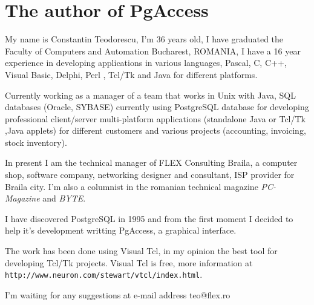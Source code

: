 \section{The author of PgAccess}
My name is Constantin Teodorescu, I'm 36 years old, I have graduated the 
Faculty of Computers and Automation Bucharest, ROMANIA, I have a 16 year 
experience in developing applications in various languages, Pascal, C, C++, 
Visual Basic, Delphi, Perl , Tcl/Tk and Java for different platforms. 

Currently working as a manager of a team that works in Unix with Java, 
SQL databases (Oracle, SYBASE) currently using PostgreSQL database for 
developing professional client/server multi-platform applications (standalone 
Java or Tcl/Tk ,Java applets) for different customers and various projects 
(accounting, invoicing, stock inventory).

In present I am the technical manager of FLEX Consulting Braila, a computer 
shop, software company, networking designer and consultant, ISP provider for 
Braila city. I'm also a columnist in the romanian technical magazine 
\emph{PC-Magazine} and \emph{BYTE}.

I have discovered PostgreSQL in 1995 and from the first moment I decided to 
help it's development writting PgAccess, a graphical interface.

The work has been done using Visual Tcl, in my opinion the best tool for 
developing Tcl/Tk projects. Visual Tcl is free, more information at 
\texttt{http://www.neuron.com/stewart/vtcl/index.html}.

I'm waiting for any suggestions at e-mail address teo@flex.ro
